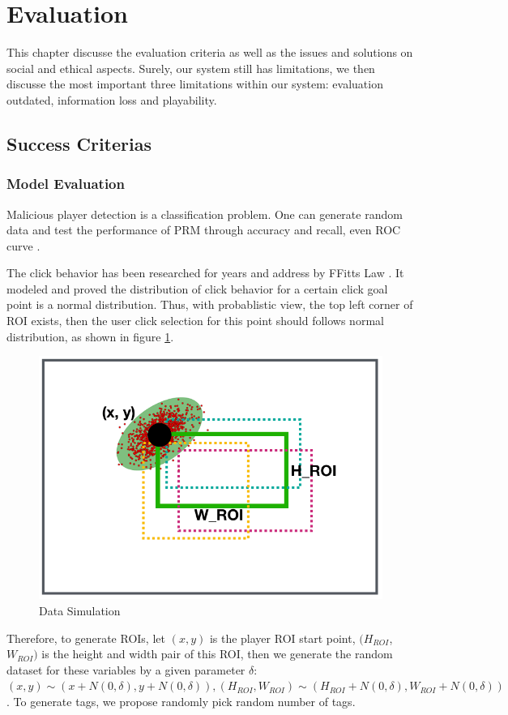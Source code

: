 \section{Evaluation}

This chapter discusse the evaluation criteria as well as the issues and solutions on social and ethical aspects.
Surely, our system still has limitations, we then discusse the most important three limitations within our system: 
evaluation outdated, information loss and playability.

\subsection{Success Criterias}

\subsubsection{Model Evaluation}

Malicious player detection is a classification problem. 
One can generate random data and test the performance of PRM through accuracy and recall, even ROC curve \cite{hanley1982meaning}.

The click behavior has been researched for years and address by FFitts Law \cite{bi2013ffitts}.
It modeled and proved the distribution of click behavior for a certain click goal point is a normal distribution.
Thus, with probablistic view, the top left corner of ROI exists, then the user click selection 
for this point should follows normal distribution, as shown in figure \ref{fig:evaluation}.

\begin{figure}[htp]
\centering
\includegraphics[width=0.5\columnwidth]{figures/evaluation}
\caption{Data Simulation}
\label{fig:evaluation}
\end{figure}

Therefore, to generate ROIs, let $(x, y)$ is the player ROI start point,  $(H_{ROI}$, $W_{ROI})$ is the height
and width pair of this ROI, then we generate the random dataset for these variables by a given
parameter $\delta$: $(x, y) \sim (x+N(0, \delta), y+N(0, \delta)), (H_{ROI}, W_{ROI}) \sim (H_{ROI}+N(0, \delta), W_{ROI}+N(0, \delta))$.
To generate tags, we propose randomly pick random number of tags.

